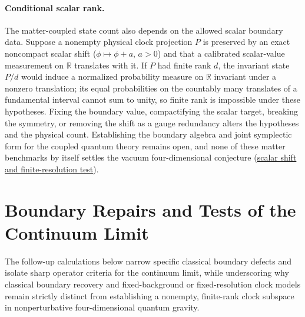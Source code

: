 \documentclass[10pt,a4paper]{article}
\numberwithin{equation}{section}
\newcommand{\repo}[2]{\href{https://github.com/sprajs/quantum-gravity/blob/main/#1}{#2}}
\begin{document}
\paragraph{Conditional scalar rank.}
The matter-coupled state count also depends on the allowed scalar boundary data. Suppose a nonempty physical clock projection $P$ is preserved by an exact noncompact scalar shift ($\phi\mapsto\phi+a$, $a>0$) and that a calibrated scalar-value measurement on $\mathbb{R}$ translates with it. If $P$ had finite rank $d$, the invariant state $P/d$ would induce a normalized probability measure on $\mathbb{R}$ invariant under a nonzero translation; its equal probabilities on the countably many translates of a fundamental interval cannot sum to unity, so finite rank is impossible under these hypotheses. Fixing the boundary value, compactifying the scalar target, breaking the symmetry, or removing the shift as a gauge redundancy alters the hypotheses and the physical count. Establishing the boundary algebra and joint symplectic form for the coupled quantum theory remains open, and none of these matter benchmarks by itself settles the vacuum four-dimensional conjecture (\repo{audit/matter-state-count.md}{scalar shift and finite-resolution test}).

\section{Boundary Repairs and Tests of the Continuum Limit}

The follow-up calculations below narrow specific classical boundary defects and isolate sharp operator criteria for the continuum limit, while underscoring why classical boundary recovery and fixed-background or fixed-resolution clock models remain strictly distinct from establishing a nonempty, finite-rank clock subspace in nonperturbative four-dimensional quantum gravity.
\end{document}
